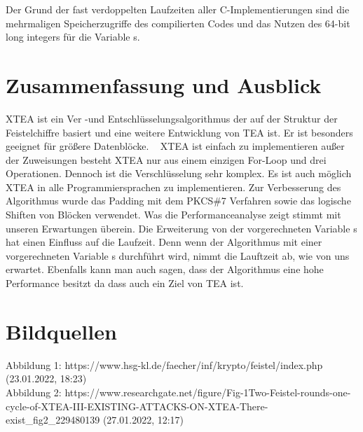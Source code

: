 \documentclass[course=asp]{aspdoc}
\begin{document}
Der Grund der fast verdoppelten Laufzeiten aller C-Implementierungen sind die mehrmaligen Speicherzugriffe des compilierten Codes und das Nutzen des 64-bit long integers für die Variable s.

\section{Zusammenfassung und Ausblick}
XTEA ist ein Ver -und Entschlüsselungsalgorithmus der auf der Struktur der Feistelchiffre basiert und eine weitere Entwicklung von TEA ist. Er ist besonders geeignet für größere Datenblöcke. ~\cite{appel2016sicherheitsaspekte}
XTEA ist einfach zu implementieren außer der Zuweisungen besteht XTEA nur aus einem einzigen For-Loop und drei Operationen. Dennoch ist die Verschlüsselung sehr komplex. Es ist auch möglich XTEA in alle Programmiersprachen zu implementieren.
Zur Verbesserung des Algorithmus wurde das Padding mit dem PKCS\#7 Verfahren sowie das logische Shiften von Blöcken verwendet.
Was die Performanceanalyse zeigt stimmt mit unseren Erwartungen überein. Die Erweiterung von der vorgerechneten Variable s hat einen Einfluss auf die Laufzeit. Denn wenn der Algorithmus mit einer vorgerechneten Variable s durchführt wird, nimmt die Lauftzeit ab, wie von uns erwartet. Ebenfalls kann man auch sagen, dass der Algorithmus eine hohe Performance besitzt da dass auch ein Ziel von TEA ist. ~\cite{appel2016sicherheitsaspekte}

\newpage
\section{Bildquellen}
Abbildung 1: https://www.hsg-kl.de/faecher/inf/krypto/feistel/index.php (23.01.2022, 18:23) \\
Abbildung 2: https://www.researchgate.net/figure/Fig-1Two-Feistel-rounds-one-cycle-of-XTEA-III-EXISTING-ATTACKS-ON-XTEA-There-exist\_fig2\_229480139 (27.01.2022, 12:17)\\


{}
\end{document}
